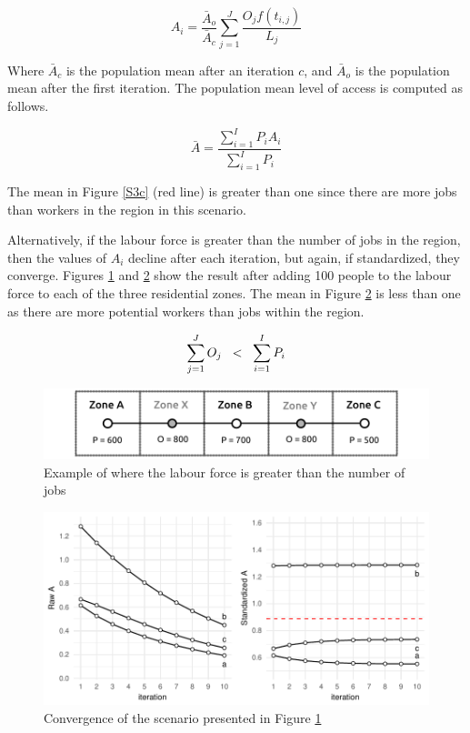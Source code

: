 \documentclass[11 pt, letterpaper]{article}
\begin{document}
{\begin{equation}
A_{i} = \frac{\bar A_o}{\bar A_c} \sum_{j = 1}^{J} \frac{ O_j f(t_{i,j})}{L_{j}} 
\end{equation}

Where $\bar A_c$ is the population mean after an iteration $c$, and $\bar A_o$ is the population mean after the first iteration. The population mean level of access is computed as follows.

\begin{equation}
\bar A = \frac{\sum_{i=1}^{I} P_i A_i}{\sum_{i=1}^{I} P_i}
\end{equation}

The mean in Figure \ref{S3c} (red line) is greater than one since there are more jobs than workers in the region in this scenario.

Alternatively, if the labour force is greater than the number of jobs in the region, then the values of $A_i$ decline after each iteration, but again, if standardized, they converge. Figures \ref{S4} and \ref{S4c} show the result after adding 100 people to the labour force to each of the three residential zones. The mean in Figure \ref{S4c} is less than one as there are more potential workers than jobs within the region.

\begin{equation}
\sum_{j = 1}^{J} O_j \hspace{2mm} < \hspace{2mm} \sum_{i = 1}^{I} P_i
\end{equation}
\begin{figure}[H]
	\caption{Example of where the labour force is greater than the number of jobs} 
	\label{S4}
	\centerline{\includegraphics[width=5in]{figures/linear_city/linear_city_S4.pdf}}
\end{figure}
\begin{figure}[H]
	\caption{Convergence of the scenario presented in Figure \ref{S4}} 
	\label{S4c}
	\centerline{\includegraphics[width=6in]{figures/convg/conRS4.pdf}}
\end{figure}

}
\end{document}
